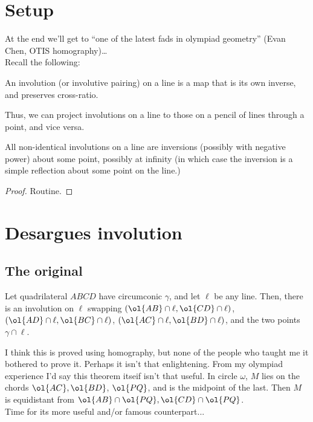 \documentclass[labelsBySect]{seto}
\begin{document}
\section{Setup}
At the end we'll get to ``one of the latest fads in olympiad geometry'' (Evan Chen, OTIS homography)\dots\\[4pt]
Recall the following:
\begin{thm}
An involution (or involutive pairing) on a line is a map that is its own inverse, and preserves cross-ratio.
\end{thm}
Thus, we can project involutions on a line to those on a pencil of lines through a point, and vice versa.
\begin{thm}
All non-identical involutions on a line are inversions (possibly with negative power) about some point, possibly at infinity (in which case the inversion is a simple reflection about some point on the line.)
\end{thm}
\begin{proof}
Routine.
\end{proof}
\section{Desargues involution}
\subsection{The original}
\begin{thm}
Let quadrilateral $ABCD$ have circumconic $\gamma$, and let $\ell$ be any line. Then, there is an involution on $\ell$ swapping $(\ol{AB}\cap\ell,\ol{CD}\cap\ell)$, $(\ol{AD}\cap\ell,\ol{BC}\cap\ell)$, $(\ol{AC}\cap\ell,\ol{BD}\cap\ell)$, and the two points $\gamma\cap\ell$.
\end{thm}
I think this is proved using homography, but none of the people who taught me it bothered to prove it. Perhaps it isn't that enlightening.
From my olympiad experience I'd say this theorem itseif isn't that useful.
 In circle $\omega$, $M$ lies on the chords $\ol{AC},\ol{BD}$, $\ol{PQ}$, and is the midpoint of the last. Then $M$ is equidistant from $\ol{AB}\cap\ol{PQ},\ol{CD}\cap\ol{PQ}$. 
\\[4pt]
Time for its more useful and/or famous counterpart...
\end{document}
